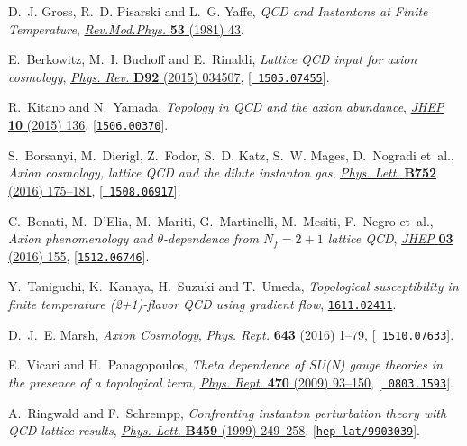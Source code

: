 \documentclass{PoS}
\begin{document}
\begin{thebibliography}{100}
D.~J. Gross, R.~D. Pisarski and L.~G. Yaffe, \emph{{QCD and Instantons at
  Finite Temperature}},
  \href{http://dx.doi.org/10.1103/RevModPhys.53.43}{\emph{Rev.Mod.Phys.} {\bf
  53} (1981) 43}.

E.~Berkowitz, M.~I. Buchoff and E.~Rinaldi, \emph{{Lattice QCD input for axion
  cosmology}}, \href{http://dx.doi.org/10.1103/PhysRevD.92.034507}{\emph{Phys.
  Rev.} {\bf D92} (2015) 034507}, [\href{https://arxiv.org/abs/1505.07455}{{\tt
  1505.07455}}].

R.~Kitano and N.~Yamada, \emph{{Topology in QCD and the axion abundance}},
  \href{http://dx.doi.org/10.1007/JHEP10(2015)136}{\emph{JHEP} {\bf 10} (2015)
  136}, [\href{https://arxiv.org/abs/1506.00370}{{\tt 1506.00370}}].

S.~Borsanyi, M.~Dierigl, Z.~Fodor, S.~D. Katz, S.~W. Mages, D.~Nogradi et~al.,
  \emph{{Axion cosmology, lattice QCD and the dilute instanton gas}},
  \href{http://dx.doi.org/10.1016/j.physletb.2015.11.020}{\emph{Phys. Lett.}
  {\bf B752} (2016) 175--181}, [\href{https://arxiv.org/abs/1508.06917}{{\tt
  1508.06917}}].

C.~Bonati, M.~D'Elia, M.~Mariti, G.~Martinelli, M.~Mesiti, F.~Negro et~al.,
  \emph{{Axion phenomenology and $\theta$-dependence from $N_f = 2+1$ lattice
  QCD}}, \href{http://dx.doi.org/10.1007/JHEP03(2016)155}{\emph{JHEP} {\bf 03}
  (2016) 155}, [\href{https://arxiv.org/abs/1512.06746}{{\tt 1512.06746}}].

Y.~Taniguchi, K.~Kanaya, H.~Suzuki and T.~Umeda, \emph{{Topological
  susceptibility in finite temperature (2+1)-flavor QCD using gradient flow}},
  \href{https://arxiv.org/abs/1611.02411}{{\tt 1611.02411}}.

D.~J.~E. Marsh, \emph{{Axion Cosmology}},
  \href{http://dx.doi.org/10.1016/j.physrep.2016.06.005}{\emph{Phys. Rept.}
  {\bf 643} (2016) 1--79}, [\href{https://arxiv.org/abs/1510.07633}{{\tt
  1510.07633}}].

E.~Vicari and H.~Panagopoulos, \emph{{Theta dependence of SU(N) gauge theories
  in the presence of a topological term}},
  \href{http://dx.doi.org/10.1016/j.physrep.2008.10.001}{\emph{Phys. Rept.}
  {\bf 470} (2009) 93--150}, [\href{https://arxiv.org/abs/0803.1593}{{\tt
  0803.1593}}].

A.~Ringwald and F.~Schrempp, \emph{{Confronting instanton perturbation theory
  with QCD lattice results}},
  \href{http://dx.doi.org/10.1016/S0370-2693(99)00682-6}{\emph{Phys. Lett.}
  {\bf B459} (1999) 249--258},
  [\href{https://arxiv.org/abs/hep-lat/9903039}{{\tt hep-lat/9903039}}].


\end{thebibliography}
\end{document}

